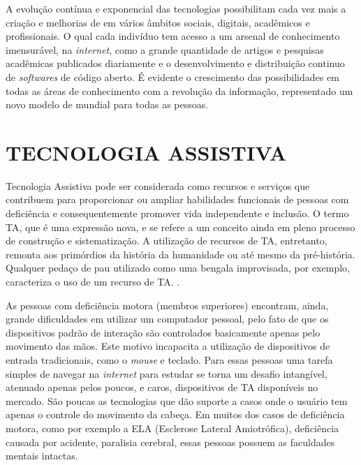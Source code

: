 
A evolução contínua e exponencial das tecnologias possibilitam cada vez mais a criação e melhorias de em vários âmbitos sociais, digitais, acadêmicos e profissionais. O qual cada indivíduo tem acesso a um arsenal de conhecimento imensurável, na \textit{internet}, como a grande quantidade de artigos e pesquisas acadêmicas publicados diariamente e o desenvolvimento e distribuição continuo de \textit{softwares} de código aberto. É evidente o crescimento das possibilidades em todas as áreas de conhecimento com a revolução da informação, representado um novo modelo de mundial para todas as pessoas.
% 
% 


\section{TECNOLOGIA ASSISTIVA}\label{Sub:ta-brasil}

Tecnologia Assistiva pode ser considerada como recursos e serviços que contribuem para proporcionar ou ampliar habilidades funcionais de pessoas com deficiência e consequentemente promover vida independente e inclusão. O termo TA, que é uma expressão nova, e se refere a um conceito ainda em pleno processo de construção e sistematização. A utilização de recursos de TA, entretanto, remonta aos primórdios da história da humanidade ou até mesmo da pré-história. Qualquer pedaço de pau utilizado como uma bengala improvisada, por exemplo, caracteriza o uso de um recurso de TA. \cite{galvao2009tecnologia-UPPERCASE}.

As pessoas com deficiência motora (membros superiores) encontram, ainda, grande dificuldades em utilizar um computador pessoal, pelo fato de que os dispositivos padrão de interação são controlados basicamente apenas pelo movimento das mãos. Este motivo incapacita a utilização de dispositivos de entrada tradicionais, como o \textit{mouse} e teclado. Para essas pessoas uma tarefa simples de navegar na \textit{internet} para estudar se torna um desafio intangível, atenuado apenas pelos poucos, e caros, dispositivos de TA disponíveis no mercado. São poucas as tecnologias que dão suporte a casos onde o usuário tem apenas o controle do movimento da cabeça. Em muitos dos casos de deficiência motora, como por exemplo a ELA (Esclerose Lateral Amiotrófica), deficiência causada por acidente, paralisia cerebral, essas pessoas possuem as faculdades mentais intactas.
% 
% 

